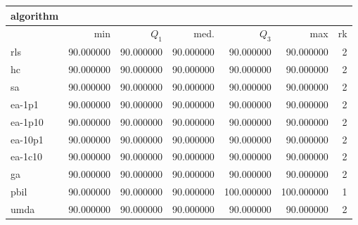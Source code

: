 \begin{tabular}{@{}l*{5}{>{{}}N{3}{0}}>{{}}N{2}{0}@{}}
\toprule
{algorithm} &  \\
\midrule
& {min} & {$Q_1$} & {med.} & {$Q_3$} & {max} & {rk}\\
\midrule
rls & {\color{blue}} 90.000000 & {\color{blue}} 90.000000 & {\color{blue}} 90.000000 & 90.000000 & 90.000000 & 2\\
hc & {\color{blue}} 90.000000 & {\color{blue}} 90.000000 & {\color{blue}} 90.000000 & 90.000000 & 90.000000 & 2\\
sa & {\color{blue}} 90.000000 & {\color{blue}} 90.000000 & {\color{blue}} 90.000000 & 90.000000 & 90.000000 & 2\\
ea-1p1 & {\color{blue}} 90.000000 & {\color{blue}} 90.000000 & {\color{blue}} 90.000000 & 90.000000 & 90.000000 & 2\\
ea-1p10 & {\color{blue}} 90.000000 & {\color{blue}} 90.000000 & {\color{blue}} 90.000000 & 90.000000 & 90.000000 & 2\\
ea-10p1 & {\color{blue}} 90.000000 & {\color{blue}} 90.000000 & {\color{blue}} 90.000000 & 90.000000 & 90.000000 & 2\\
ea-1c10 & {\color{blue}} 90.000000 & {\color{blue}} 90.000000 & {\color{blue}} 90.000000 & 90.000000 & 90.000000 & 2\\
ga & {\color{blue}} 90.000000 & {\color{blue}} 90.000000 & {\color{blue}} 90.000000 & 90.000000 & 90.000000 & 2\\
pbil & {\color{blue}} 90.000000 & {\color{blue}} 90.000000 & {\color{blue}} 90.000000 & {\color{blue}} 100.000000 & {\color{blue}} 100.000000 & 1\\
umda & {\color{blue}} 90.000000 & {\color{blue}} 90.000000 & {\color{blue}} 90.000000 & 90.000000 & 90.000000 & 2\\
\bottomrule
\end{tabular}
